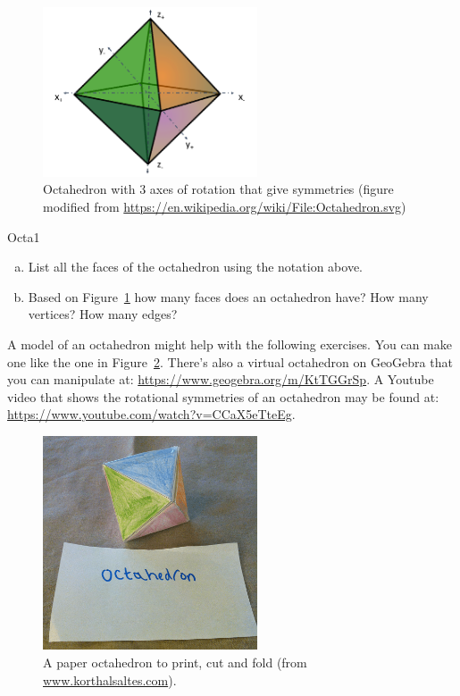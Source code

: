 \begin{figure}[ht]
\begin{center}
\includegraphics[width=2.5in]{images/AxesOfOctahedron.png}
\caption{\label{fig:OctaRot}Octahedron with 3 axes of rotation that give symmetries (figure modified from \url{https://en.wikipedia.org/wiki/File:Octahedron.svg})
}
\end{center}
\end{figure}


\begin{exercise}{Octa1}
\begin{enumerate}[(a)]
\item List all the faces of the octahedron using the notation above.
\item Based on Figure~\ref{fig:OctaRot}  how many faces does an octahedron have? How many vertices?  How many edges?
\end{enumerate}
\end {exercise}

A model of an octahedron might help with the following exercises.  You can make one like the one in Figure~\ref{fig:OctaFold}. There's also a virtual octahedron on GeoGebra that you can manipulate at: 
\url{https://www.geogebra.org/m/KtTGGrSp}.  A Youtube video that shows the rotational symmetries of an octahedron may be found at:
\url{https://www.youtube.com/watch?v=CCaX5eTteEg}.

\begin{figure}[ht]
\begin{center}
\includegraphics[width=2.5in]{images/OctahedronFold.png}
\caption{\label{fig:OctaFold} A paper octahedron to print, cut and fold
 (from \url{www.korthalsaltes.com}). }

\end{center}
\end{figure}

